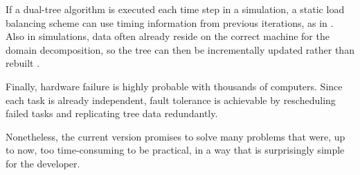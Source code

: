 \documentclass[twoside,leqno,twocolumn]{article}
\begin{document}
If a dual-tree algorithm is executed each time step in a simulation, a static load balancing scheme can use timing information from previous iterations, as in \cite{liu94experiences, salmon_thesis, singh_thesis}.
Also in simulations, data often already reside on the correct machine for the domain decomposition, so the tree can then be incrementally updated rather than rebuilt \cite{liu94experiences}.

Finally, hardware failure is highly probable with thousands of computers.
Since each task is already independent, fault tolerance is achievable by rescheduling failed tasks and replicating tree data redundantly.

Nonetheless, the current version promises to solve many problems that were, up to now, too time-consuming to be practical, in a way that is surprisingly simple for the developer.



\end{document}
